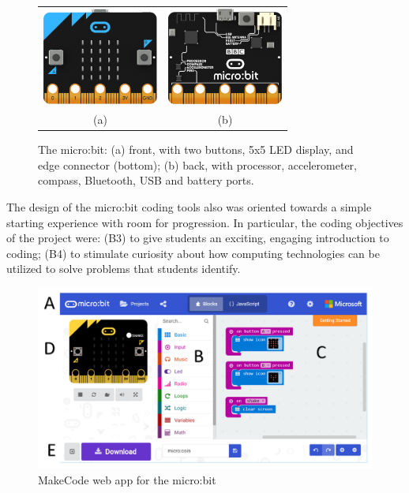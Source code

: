 \begin{figure} 
\begin{tabular}{cc}
  \includegraphics[width=1.5in]{images/microbit-front.png} &
  \includegraphics[width=1.5in]{images/microbit-back.png} \\
  (a) & (b) 
\end{tabular}
\caption{\label{fig:microbit}The micro:bit: (a) front, with two buttons, 
  5x5 LED display, and edge connector (bottom); (b) back, with processor, accelerometer, compass, Bluetooth, USB and battery ports.}
\end{figure}


The design of the micro:bit coding tools also was oriented towards a 
simple starting experience with room for progression. In particular, the coding 
objectives of the project were: (B3)
to give students an exciting, engaging introduction to coding;
(B4) to stimulate curiosity about how computing technologies can be utilized 
  to solve problems that students identify. 

  \begin{figure}[t] 
    \includegraphics[width=6in]{images/webApp.png}
    \caption{\label{fig:snapshot}MakeCode web app for the micro:bit}
\end{figure}

